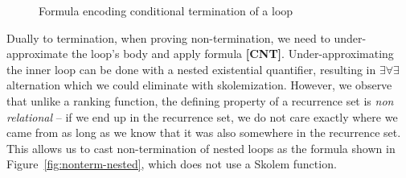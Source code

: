 \documentclass[preprint]{sigplanconf}
\theoremstyle{definition}
\newtheorem{definition}[theorem]{Definition}
\begin{document}
\begin{figure*}
\begin{framed}
 \end{framed}
\caption{Formula encoding conditional termination of a loop} \label{fig:conditional_termination}
\end{figure*}

Dually to termination, when proving non-termination, we need to
under-approximate the loop's body and apply formula {\bf [CNT]}.
%
% 
%
%
Under-approximating the inner loop can be done with a nested existential quantifier, resulting in
$\exists \forall \exists$ alternation which we could eliminate with skolemization.  
However, we observe that
unlike a ranking function,
the defining property of a recurrence set is \emph{non relational} -- if we
end up in the recurrence set, we do not care exactly where we came from as
long as we know that it was also somewhere in the recurrence set.  
This allows us to cast non-termination of nested loops as the formula shown in
Figure~\ref{fig:nonterm-nested}, which does not use a Skolem function.
\end{document}
